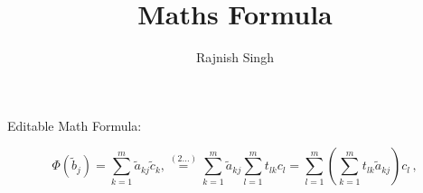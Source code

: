 \documentclass{article}
\title{Maths Formula}
\author{Rajnish Singh}
\begin{document}
        \maketitle

        Editable Math Formula:

        \[
        \Phi(\tilde{b}_{j})=\sum_{k=1}^{m}\tilde{a}_{k j}\tilde{c}_{k},\stackrel{(2\dots)}{=}\sum_{k=1}^{m}\tilde{a}_{k j}\sum_{l=1}^{m}t_{l k}c_{l}=\sum_{l=1}^{m}\left(\sum_{k=1}^{m}t_{l k}\tilde{a}_{k j}\right)c_{l}\,,
        \]

        
\end{document}
